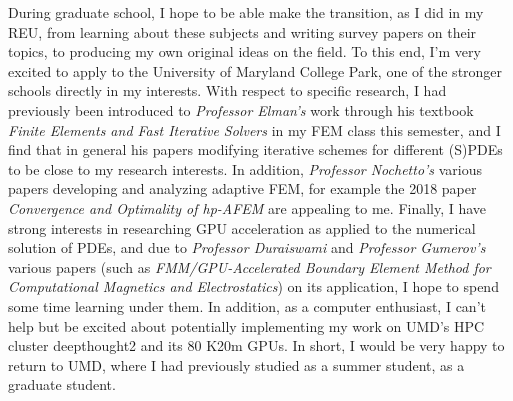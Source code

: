 \documentclass[11pt]{article}
\begin{document}
During graduate school, I hope to be able make the transition, as I did in my
REU, from learning about these subjects and writing survey papers on their
topics, to producing my own original ideas on the field. To this end, I'm very
excited to apply to the University of Maryland College Park, one of the stronger
schools directly in my interests. With respect to specific research, I had
previously been introduced to {\em Professor Elman's} work through his textbook
{\em Finite Elements and Fast Iterative Solvers} in my FEM class this semester,
and I find that in general his papers modifying iterative schemes for different
(S)PDEs to be close to my research interests. In addition, {\em Professor
Nochetto's} various papers developing and analyzing adaptive FEM, for example
the 2018 paper {\em Convergence and Optimality of hp-AFEM} are appealing to me.
Finally, I have strong interests in researching GPU acceleration as applied to
the numerical solution of PDEs, and due to {\em Professor Duraiswami} and {\em
Professor Gumerov's} various papers (such as {\em FMM/GPU-Accelerated Boundary
Element Method for Computational Magnetics and Electrostatics}) on its
application, I hope to spend some time learning under them. In addition, as
a computer enthusiast, I can't help but be excited about potentially
implementing my work on UMD's HPC cluster deepthought2 and its 80 K20m GPUs. In
short, I would be very happy to return to UMD, where I had previously studied as
a summer student, as a graduate student.
\end{document}
